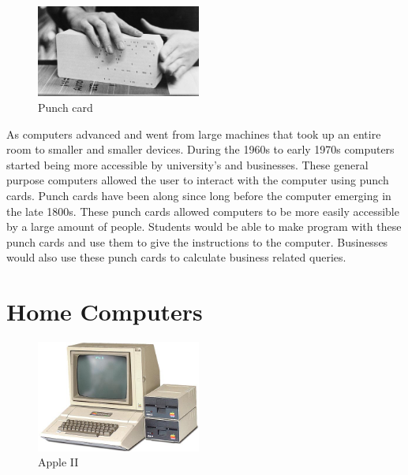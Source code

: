 \begin{figure}
  \begin{center}
    \includegraphics[width=0.48\textwidth]{img/punchcard.jpg}
  \end{center}
  \caption{Punch card}
\end{figure}

As computers advanced and went from large machines that took up an entire room to smaller and smaller devices. During the 1960s to early 1970s computers started being more accessible by university's and businesses. These general purpose computers allowed the user to interact with the computer using punch cards. \cite{punchcard} Punch cards have been along since long before the computer emerging in the late 1800s. \cite{punchcard} These punch cards allowed computers to be more easily accessible by a large amount of people. Students would be able to make program with these punch cards and use them to give the instructions to the computer. Businesses would also use these punch cards to calculate business related queries.

\section{Home Computers}

\begin{figure}
  \begin{center}
    \includegraphics[width=0.48\textwidth]{img/appleii.jpg}
  \end{center}
  \caption{Apple II}
\end{figure}

